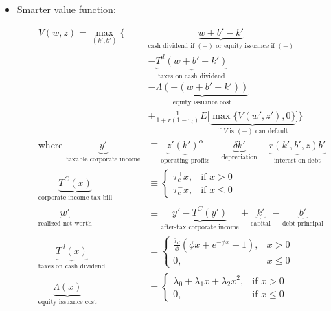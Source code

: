 \documentclass{article}
\begin{document}
\begin{itemize}
\pagebreak

\item Smarter value function:

\begin{align*}
V(w, z) =
\max_{(k', b')} \Bigg\{ 
& \underbrace{w + b' - k'}_{\text{cash dividend if } (+) \text{ or equity issuance if } (-)} \\ 
&- \underbrace{T^d(w + b' - k')}_{\text{taxes on cash dividend}} \\
&- \underbrace{\Lambda(-(w + b' - k'))}_{\text{equity issuance cost}} \\
&+ \frac{1}{1+r(1-\tau_i)} E\Big[\underbrace{\max\{ V(w', z'), 0\}}_{\text{if }V \text{ is } (-) \text{ can default}}\Big] \Bigg\} \\
\text{where }
\underbrace{y'}_{\text{taxable corporate income}} &\equiv \underbrace{z' (k')^\alpha}_{\text{operating profits}} - \underbrace{\delta k'}_{\text{depreciation}} - \underbrace{r(k', b', z) b'}_{\text{interest on debt}} \\
\underbrace{T^C(x)}_{\text{corporate income tax bill}} &\equiv 
\begin{cases} 
\tau_c^+ x, & \text{if }x > 0 \\
\tau_c^- x, & \text{if }x \le 0
\end{cases}\\
\underbrace{w'}_{\text{realized net worth}} &\equiv \underbrace{y' - T^C(y')}_{\text{after-tax corporate income}}+ \underbrace{k'}_{\text{capital}}  - \underbrace{b'}_{\text{debt principal}} \\
\underbrace{T^d(x)}_{\text{taxes on cash dividend}} &= 
\begin{cases}
\frac{\bar \tau_d}{\phi}(\phi x + e^{-\phi x} - 1), & x > 0 \\
0,& x \le 0
\end{cases} \\
\underbrace{\Lambda(x)}_{\text{equity issuance cost}} &= 
\begin{cases} 
\lambda_0 + \lambda_1 x + \lambda_2 x^2, & \text{if }x > 0 \\
0, & \text{if }x \le 0
\end{cases}
\end{align*}



\end{itemize}
\end{document}
